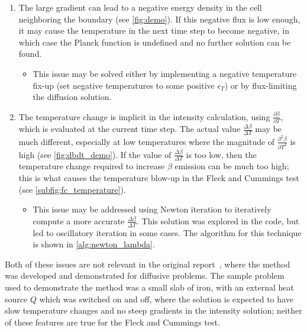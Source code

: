 \documentclass{template}
\begin{document}
\begin{enumerate}
    \item\label{item:gradient} The large gradient can lead to a negative energy density in the cell neighboring the boundary (see \autoref{fig:demo}). If this negative flux is low enough, it may cause the temperature in the next time step to become negative, in which case the Planck function is undefined and no further solution can be found.
    \begin{itemize}
        \item This issue may be solved either by implementing a negative temperature fix-up (set negative temperatures to some positive $\epsilon_T$) or by flux-limiting the diffusion solution.
    \end{itemize}
    \item\label{item:dbdt} The temperature change is implicit in the intensity calculation, using $\frac{\partial \beta}{\partial T}$, which is evaluated at the current time step. The actual value $\frac{\Delta \beta}{\Delta T}$ may be much different, especially at low temperatures where the magnitude of $\frac{\partial^2 \beta}{\partial T^2}$ is high (see \autoref{fig:dbdt_demo}). If the value of $\frac{\Delta \beta}{\Delta T}$ is too low, then the temperature change required to increase $\beta$ emission can be much too high; this is what causes the temperature blow-up in the Fleck and Cummings test (see \autoref{subfig:fc_temperature}).
    \begin{itemize}
        \item This issue may be addressed using Newton iteration to iteratively compute a more accurate $\frac{\Delta \beta}{\Delta T}$. This solution was explored in the code, but led to oscillatory iteration in some cases. The algorithm for this technique is shown in \autoref{alg:newton_lambda}.
    \end{itemize}
\end{enumerate}

Both of these issues are not relevant in the original report~\cite{morel1985synthetic}, where the method was developed and demonstrated for diffusive problems. The sample problem used to demonstrate the method was a small slab of iron, with an external heat source $Q$ which was switched on and off, where the solution is expected to have slow temperature changes and no steep gradients in the intensity solution; neither of these features are true for the Fleck and Cummings test.
\end{document}
